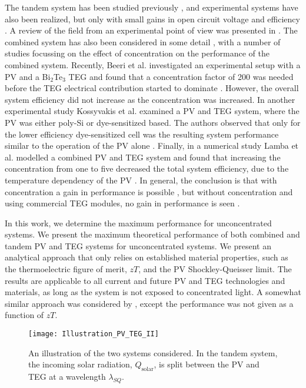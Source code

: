 \documentclass[fleqn,10pt]{SelfArx} %
\newcommand{\n}[1]{\mathrm{#1}}
\begin{document}
The tandem system has been studied previously \cite{Luque_1999,Zhang_2005,Kraemer_2008}, and experimental systems have also been realized, but only with small gains in open circuit voltage and efficiency \cite{Mizoshiri_2012,Ju_2012}. A review of the field from an experimental point of view was presented in \citet{Sundarraj_2014}. The combined system has also been considered in some detail \cite{Sark_2011,Kiflemariam_2014,Liao_2014,Zhang_2014,Attivissimo_2015,Wu_2015}, with a number of studies focussing on the effect of concentration on the performance of the combined system. Recently, Beeri et al. investigated an experimental setup with a PV and a Bi$_2$Te$_3$ TEG and found that a concentration factor of 200 was needed before the TEG electrical contribution started to dominate \cite{Beeri_2015}. However, the overall system efficiency did not increase as the concentration was increased. In another experimental study Kossyvakis et al. examined a PV and TEG system, where the PV was either poly-Si or dye-sensitized based. The authors observed that only for the lower efficiency dye-sensitized cell was the resulting system performance similar to the operation of the PV alone \cite{Kossyvakis_2016}. Finally, in a numerical study Lamba et al. modelled a combined PV and TEG system and found that increasing the concentration from one to five decreased the total system efficiency, due to the temperature dependency of the PV \cite{Lamba_2016}. In general, the conclusion is that with concentration a gain in performance is possible \cite{Vorobiev_2006,Lin_2014,Xu_2014,Najafi_2013,Fisac_2014}, but without concentration and using commercial TEG modules, no gain in performance is seen \cite{Lorenzi_2015,Bjoerk_2015b}.

In this work, we determine the maximum performance for unconcentrated systems. We present the maximum theoretical performance of both combined and tandem PV and TEG systems for unconcentrated systems. We present an analytical approach that only relies on established material properties, such as the thermoelectric figure of merit, $zT$, and the PV Shockley-Queisser limit. The results are applicable to all current and future PV and TEG technologies and materials, as long as the system is not exposed to concentrated light. A somewhat similar approach was considered by \citet{Lorenzi_2015}, except the performance was not given as a function of $zT$.

\begin{figure*}[!t]
  \centering
  \texttt{[image: Illustration\_PV\_TEG\_II]}
  \caption{An illustration of the two systems considered. In the tandem system, the incoming solar radiation, $Q_\n{solar}$, is split between the PV and TEG at a wavelength $\lambda_{SQ}$.}
  \label{Fig_Illustration_PV_TEG_II}
\end{figure*}
\end{document}
